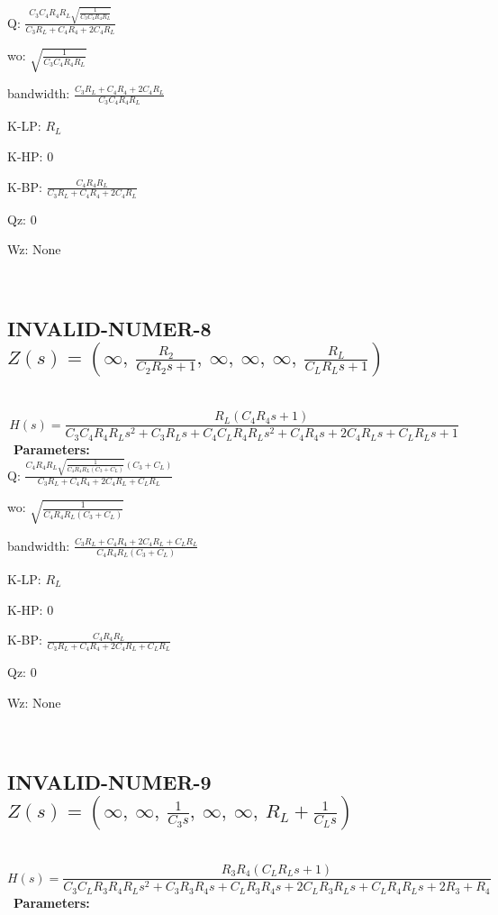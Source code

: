 \documentclass{article}
\begin{document}
Q: $\frac{C_{3} C_{4} R_{4} R_{L} \sqrt{\frac{1}{C_{3} C_{4} R_{4} R_{L}}}}{C_{3} R_{L} + C_{4} R_{4} + 2 C_{4} R_{L}}$\ 

wo: $\sqrt{\frac{1}{C_{3} C_{4} R_{4} R_{L}}}$\ 

bandwidth: $\frac{C_{3} R_{L} + C_{4} R_{4} + 2 C_{4} R_{L}}{C_{3} C_{4} R_{4} R_{L}}$\ 

K-LP: $R_{L}$\ 

K-HP: $0$\ 

K-BP: $\frac{C_{4} R_{4} R_{L}}{C_{3} R_{L} + C_{4} R_{4} + 2 C_{4} R_{L}}$\ 

Qz: $0$\ 

Wz: $\text{None}$\ 

\ 

\subsection{INVALID-NUMER-8 $Z(s) = \left( \infty, \  \frac{R_{2}}{C_{2} R_{2} s + 1}, \  \infty, \  \infty, \  \infty, \  \frac{R_{L}}{C_{L} R_{L} s + 1}\right)$ } \ 
\textbf{\[H(s) = \frac{R_{L} \left(C_{4} R_{4} s + 1\right)}{C_{3} C_{4} R_{4} R_{L} s^{2} + C_{3} R_{L} s + C_{4} C_{L} R_{4} R_{L} s^{2} + C_{4} R_{4} s + 2 C_{4} R_{L} s + C_{L} R_{L} s + 1}\] } \ 
\textbf{Parameters:}\\ 

Q: $\frac{C_{4} R_{4} R_{L} \sqrt{\frac{1}{C_{4} R_{4} R_{L} \left(C_{3} + C_{L}\right)}} \left(C_{3} + C_{L}\right)}{C_{3} R_{L} + C_{4} R_{4} + 2 C_{4} R_{L} + C_{L} R_{L}}$\ 

wo: $\sqrt{\frac{1}{C_{4} R_{4} R_{L} \left(C_{3} + C_{L}\right)}}$\ 

bandwidth: $\frac{C_{3} R_{L} + C_{4} R_{4} + 2 C_{4} R_{L} + C_{L} R_{L}}{C_{4} R_{4} R_{L} \left(C_{3} + C_{L}\right)}$\ 

K-LP: $R_{L}$\ 

K-HP: $0$\ 

K-BP: $\frac{C_{4} R_{4} R_{L}}{C_{3} R_{L} + C_{4} R_{4} + 2 C_{4} R_{L} + C_{L} R_{L}}$\ 

Qz: $0$\ 

Wz: $\text{None}$\ 

\ 

\subsection{INVALID-NUMER-9 $Z(s) = \left( \infty, \  \infty, \  \frac{1}{C_{3} s}, \  \infty, \  \infty, \  R_{L} + \frac{1}{C_{L} s}\right)$ } \ 
\textbf{\[H(s) = \frac{R_{3} R_{4} \left(C_{L} R_{L} s + 1\right)}{C_{3} C_{L} R_{3} R_{4} R_{L} s^{2} + C_{3} R_{3} R_{4} s + C_{L} R_{3} R_{4} s + 2 C_{L} R_{3} R_{L} s + C_{L} R_{4} R_{L} s + 2 R_{3} + R_{4}}\] } \ 
\textbf{Parameters:}\\ 
\end{document}
